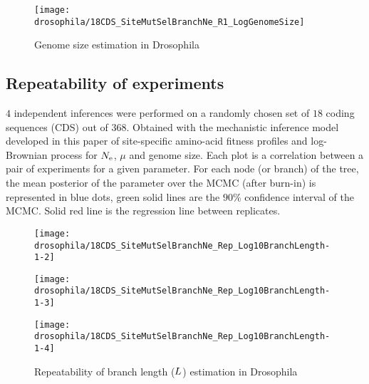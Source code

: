 \begin{figure}[H]
    \centering
    \texttt{[image: drosophila/18CDS\_SiteMutSelBranchNe\_R1\_LogGenomeSize]}
    \caption[Genome size estimation in Drosophila]{Genome size estimation in Drosophila}
\end{figure}

\subsection{Repeatability of experiments}
$4$ independent inferences were performed on a randomly chosen set of $18$ coding sequences (\acrshort{CDS}) out of $368$.
Obtained with the mechanistic inference model developed in this paper of site-specific amino-acid fitness profiles and log-Brownian process for $N_{\text{e}}$, $\mu$ and genome size.
Each plot is a correlation between a pair of experiments for a given parameter.
For each node (or branch) of the tree, the mean posterior of the parameter over the \acrshort{MCMC} (after burn-in) is represented in blue dots, green solid lines are the $90\%$ confidence interval of the \acrshort{MCMC}.
Solid red line is the regression line between replicates.

\begin{figure}[H]
    \centering
    \begin{minipage}{0.32\linewidth}
        \texttt{[image: drosophila/18CDS\_SiteMutSelBranchNe\_Rep\_Log10BranchLength-1-2]}
    \end{minipage} \hfill
    \begin{minipage}{0.32\linewidth}
        \texttt{[image: drosophila/18CDS\_SiteMutSelBranchNe\_Rep\_Log10BranchLength-1-3]}
    \end{minipage} \hfill
    \begin{minipage}{0.32\linewidth}
        \texttt{[image: drosophila/18CDS\_SiteMutSelBranchNe\_Rep\_Log10BranchLength-1-4]}
    \end{minipage}
    \caption[Repeatability of branch length estimation in Drosophila]{Repeatability of branch length ($L$) estimation in Drosophila}
\end{figure}

